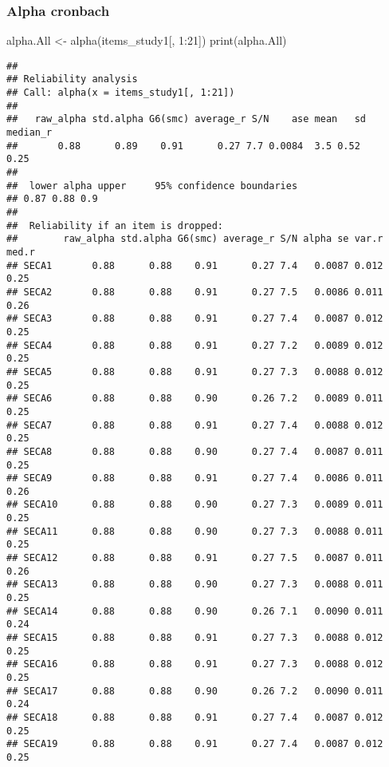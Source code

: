 \documentclass[
]{article}
\newenvironment{Shaded}{\begin{snugshade}}{\end{snugshade}}
\newcommand{\DecValTok}[1]{\textcolor[rgb]{0.00,0.00,0.81}{#1}}
\newcommand{\FunctionTok}[1]{\textcolor[rgb]{0.00,0.00,0.00}{#1}}
\newcommand{\NormalTok}[1]{#1}
\newcommand{\OtherTok}[1]{\textcolor[rgb]{0.56,0.35,0.01}{#1}}
\newcommand{\SpecialCharTok}[1]{\textcolor[rgb]{0.00,0.00,0.00}{#1}}
\begin{document}
\hypertarget{alpha-cronbach}{%
\subsubsection{Alpha cronbach}\label{alpha-cronbach}}

\begin{Shaded}
\begin{Highlighting}[]
\NormalTok{alpha.All }\OtherTok{\textless{}{-}} \FunctionTok{alpha}\NormalTok{(items\_study1[, }\DecValTok{1}\SpecialCharTok{:}\DecValTok{21}\NormalTok{])}
\FunctionTok{print}\NormalTok{(alpha.All)}
\end{Highlighting}
\end{Shaded}

\begin{verbatim}
## 
## Reliability analysis   
## Call: alpha(x = items_study1[, 1:21])
## 
##   raw_alpha std.alpha G6(smc) average_r S/N    ase mean   sd median_r
##       0.88      0.89    0.91      0.27 7.7 0.0084  3.5 0.52     0.25
## 
##  lower alpha upper     95% confidence boundaries
## 0.87 0.88 0.9 
## 
##  Reliability if an item is dropped:
##        raw_alpha std.alpha G6(smc) average_r S/N alpha se var.r med.r
## SECA1       0.88      0.88    0.91      0.27 7.4   0.0087 0.012  0.25
## SECA2       0.88      0.88    0.91      0.27 7.5   0.0086 0.011  0.26
## SECA3       0.88      0.88    0.91      0.27 7.4   0.0087 0.012  0.25
## SECA4       0.88      0.88    0.91      0.27 7.2   0.0089 0.012  0.25
## SECA5       0.88      0.88    0.91      0.27 7.3   0.0088 0.012  0.25
## SECA6       0.88      0.88    0.90      0.26 7.2   0.0089 0.011  0.25
## SECA7       0.88      0.88    0.91      0.27 7.4   0.0088 0.012  0.25
## SECA8       0.88      0.88    0.90      0.27 7.4   0.0087 0.011  0.25
## SECA9       0.88      0.88    0.91      0.27 7.4   0.0086 0.011  0.26
## SECA10      0.88      0.88    0.90      0.27 7.3   0.0089 0.011  0.25
## SECA11      0.88      0.88    0.90      0.27 7.3   0.0088 0.011  0.25
## SECA12      0.88      0.88    0.91      0.27 7.5   0.0087 0.011  0.26
## SECA13      0.88      0.88    0.90      0.27 7.3   0.0088 0.011  0.25
## SECA14      0.88      0.88    0.90      0.26 7.1   0.0090 0.011  0.24
## SECA15      0.88      0.88    0.91      0.27 7.3   0.0088 0.012  0.25
## SECA16      0.88      0.88    0.91      0.27 7.3   0.0088 0.012  0.25
## SECA17      0.88      0.88    0.90      0.26 7.2   0.0090 0.011  0.24
## SECA18      0.88      0.88    0.91      0.27 7.4   0.0087 0.012  0.25
## SECA19      0.88      0.88    0.91      0.27 7.4   0.0087 0.012  0.25

\end{verbatim}
\end{document}
